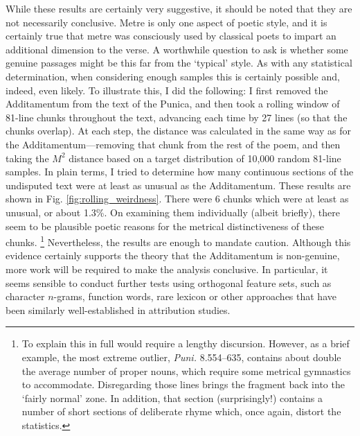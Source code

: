 \documentclass[11pt,a4paper]{scrartcl} %
\begin{document}
{While these results are certainly very suggestive, it should be noted that they are not necessarily conclusive. Metre is only one aspect of poetic style, and it is certainly true that metre was consciously used by classical poets to impart an additional dimension to the verse. A worthwhile question to ask is whether some genuine passages might be this far from the `typical' style. As with any statistical determination, when considering enough samples this is certainly possible and, indeed, even likely. To illustrate this, I did the following: I first removed the Additamentum from the text of the Punica, and then took a rolling window of 81-line chunks throughout the text, advancing each time by 27 lines (so that the chunks overlap). At each step, the distance was calculated in the same way as for the Additamentum---removing that chunk from the rest of the poem, and then taking the $M^{2}$ distance based on a target distribution of 10,000 random 81-line samples. In plain terms, I tried to determine how many continuous sections of the undisputed text were at least as unusual as the Additamentum. These results are shown in Fig. \ref{fig:rolling_weirdness}. There were 6 chunks which were at least as unusual, or about 1.3\%. On examining them individually (albeit briefly), there seem to be plausible poetic reasons for the metrical distinctiveness of these chunks.%
\footnote{To explain this in full would require a lengthy discursion. However, as a brief example, the most extreme outlier, \textit{Puni.} 8.554--635, contains about double the average number of proper nouns, which require some metrical gymnastics to accommodate. Disregarding those lines brings the fragment back into the `fairly normal' zone. In addition, that section (surprisingly!) contains a number of short sections of deliberate rhyme which, once again, distort the statistics.}
Nevertheless, the results are enough to mandate caution. Although this evidence certainly supports the theory that the Additamentum is non-genuine, more work will be required to make the analysis conclusive. In particular, it seems sensible to conduct further tests using orthogonal feature sets, such as character $n$-grams, function words, rare lexicon or other approaches that have been similarly well-established in attribution studies.

}
\end{document}
